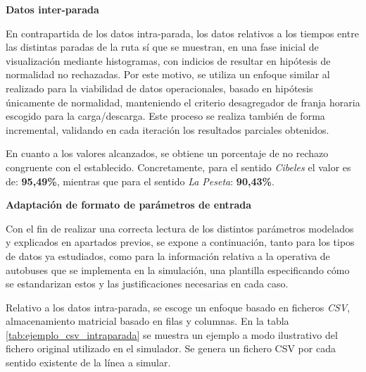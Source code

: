 \medskip
\noindent\textbf{Datos inter-parada}

En contrapartida de los datos intra-parada, los datos relativos a los tiempos entre las distintas paradas de la ruta sí que 
se muestran, en una fase inicial de visualización mediante histogramas, con indicios de resultar en hipótesis de normalidad
no rechazadas. Por este motivo, se utiliza un enfoque similar al realizado para la viabilidad de datos operacionales, basado
en hipótesis únicamente de normalidad, manteniendo el criterio desagregador de franja horaria escogido para la carga/descarga.
Este proceso se realiza también de forma incremental, validando en cada iteración los resultados parciales obtenidos.

En cuanto a los valores alcanzados, se obtiene un porcentaje de no rechazo congruente con el establecido. Concretamente,
para el sentido \textit{Cibeles} el valor es de: \textbf{95,49\%}, mientras que para el sentido \textit{La Peseta}: 
\textbf{90,43\%}.

\medskip
\noindent\textbf{Adaptación de formato de parámetros de entrada}


Con el fin de realizar una correcta lectura de los distintos parámetros modelados y explicados en apartados previos,
se expone a continuación, tanto para los tipos de datos ya estudiados, como para la información relativa a la operativa
de autobuses que se implementa en la simulación, una plantilla especificando cómo se estandarizan estos y las justificaciones
necesarias en cada caso.

Relativo a los datos intra-parada, se escoge un enfoque basado en ficheros \textit{CSV}, almacenamiento matricial basado 
en filas y columnas. En la tabla \ref{tab:ejemplo_csv_intraparada} se muestra un ejemplo a modo ilustrativo del fichero original utilizado en el simulador.
Se genera un fichero CSV por cada sentido existente de la línea a simular.

